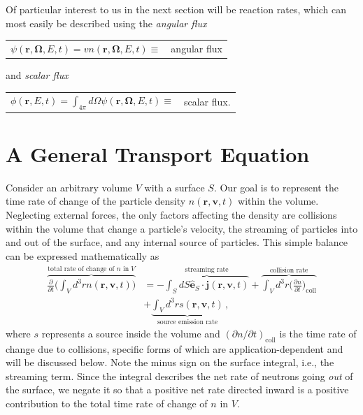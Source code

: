 
Of particular interest to us in the next section will be reaction rates, which can most easily be described using the \textit{angular flux}
\begin{center}
  \begin{tabular}{cp{2.0cm}}
    $ \psi (\mathbf{r},\mathbf{\Omega},E,t) = v n(\mathbf{r},\mathbf{\Omega},E,t) \equiv $ &
    angular flux
  \end{tabular}
\end{center}
and \textit{scalar flux}
\begin{center}
  \begin{tabular}{cp{2.0cm}}
    $ \phi (\mathbf{r},E,t) = \int_{4\pi} d\Omega \psi (\mathbf{r},\mathbf{\Omega},E,t)  \equiv $ &
    scalar flux.
  \end{tabular}
\end{center}

\section*{A General Transport Equation}

Consider an arbitrary volume $V$ with a surface $S$.  Our goal is to represent the time rate of change of the particle density $n(\mathbf{r},\mathbf{v},t)$ within the volume.  Neglecting external forces, the only factors affecting the density are collisions within the volume that change a particle's velocity, the streaming of particles into and out of the surface, and any internal source of particles.  This simple balance can be expressed mathematically as
\begin{equation}
\begin{split}
 \overbrace{ \frac{\partial}{\partial t} \Bigg ( \int_V d^3 r n(\mathbf{r},\mathbf{v},t) \Bigg ) }^{\text{total rate of change of }n\text{ in } V} 
      &=  - \overbrace{\int_S dS \mathbf{\hat{e}}_S \cdot \mathbf{j}(\mathbf{r},\mathbf{v},t) }^{\text{streaming rate}}
       + \overbrace{ \int_V d^3 r \Big( \frac{\partial n}{\partial t} \Big )_{\mathrm{coll}} }^{\text{collision rate}} \\
      &+ \underbrace{ \int_V d^3 r s(\mathbf{r},\mathbf{v},t) }_{\text{source emission rate}}  \, ,
\end{split}
\label{eq:balance}
\end{equation}
where $s$ represents a source inside the volume and $(\partial n/\partial t)_{\mathrm{coll}}$ is the time rate of change due to collisions, specific forms of which are application-dependent and will be discussed below.  Note the minus sign on the surface integral, i.e., the streaming term.  Since the integral describes the net rate of neutrons going \textit{out} of the surface, we negate it so that a positive net rate directed inward is a positive contribution to the total time rate of change of $n$ in $V$.

